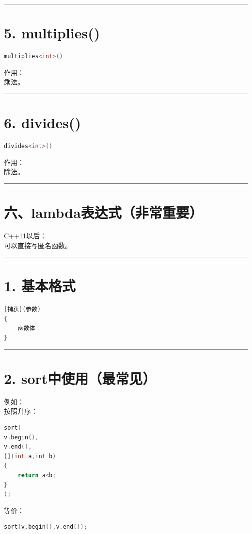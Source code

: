 \documentclass[10pt,twocolumn]{extarticle}
\begin{document}
\noindent\rule{\linewidth}{0.4pt}

\section{5. multiplies()}
\begin{lstlisting}[language=C++]
multiplies<int>()
\end{lstlisting}
作用：\\
乘法。

\noindent\rule{\linewidth}{0.4pt}

\section{6. divides()}
\begin{lstlisting}[language=C++]
divides<int>()
\end{lstlisting}
作用：\\
除法。

\noindent\rule{\linewidth}{0.4pt}

\section{六、lambda表达式（非常重要）}

C++11以后：\\
可以直接写匿名函数。

\noindent\rule{\linewidth}{0.4pt}

\section{1. 基本格式}
\begin{lstlisting}[language=C++]
[捕获](参数)
{
    函数体
}
\end{lstlisting}

\noindent\rule{\linewidth}{0.4pt}

\section{2. sort中使用（最常见）}
例如：\\
按照升序：
\begin{lstlisting}[language=C++]
sort(
v.begin(),
v.end(),
[](int a,int b)
{
    return a<b;
}
);
\end{lstlisting}
等价：
\begin{lstlisting}[language=C++]
sort(v.begin(),v.end());
\end{lstlisting}
\end{document}
